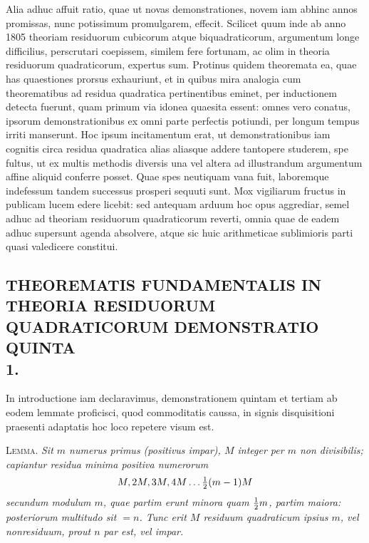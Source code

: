 \documentclass[twoside,12pt]{memoir}
\let\oldfrac\frac
\def\frac#1#2{\mathchoice{\tfrac{#1}{#2}}{\oldfrac{#1}{#2}}{\genfrac{}{}{}{2}{#1}{#2\mathstrut}}{\genfrac{}{}{}{3}{#1}{#2\mathstrut}}}
\begin{document}
Alia adhuc affuit ratio, quae ut novas demonstrationes, novem iam abhinc annos promissas, nunc potissimum promulgarem, effecit. Scilicet quum inde ab anno 1805 theoriam residuorum cubicorum atque biquadraticorum, argumentum longe difficilius, perscrutari coepissem, similem fere fortunam, ac olim in theoria residuorum quadraticorum, expertus sum. Protinus quidem theoremata ea, quae has quaestiones prorsus exhauriunt, et in quibus mira analogia cum theorematibus ad residua quadratica pertinentibus eminet, per inductionem detecta fuerunt, quam primum via idonea quaesita essent: omnes vero conatus, ipsorum demonstrationibus ex omni parte perfectis potiundi, per longum tempus irriti manserunt. Hoc ipsum incitamentum erat, ut demonstrationibus iam cognitis circa residua quadratica alias aliasque addere tantopere studerem, spe fultus, ut ex multis methodis diversis una vel altera ad illustrandum argumentum affine aliquid conferre posset. Quae spes neutiquam vana fuit, laboremque indefessum tandem successus prosperi sequuti sunt. Mox vigiliarum fructus in publicam lucem edere licebit: sed antequam arduum hoc opus aggrediar, semel adhuc ad theoriam residuorum quadraticorum reverti, omnia quae de eadem adhuc supersunt agenda absolvere, atque sic huic arithmeticae sublimioris parti quasi valedicere constitui.\pagebreak%

\subsection*{{\scriptsize THEOREMATIS FUNDAMENTALIS IN THEORIA RESIDUORUM QUADRATICORUM DEMONSTRATIO QUINTA}\\[0.5\baselineskip]
1.}
 
In introductione iam declaravimus, demonstrationem quintam et tertiam ab eodem lemmate proficisci, quod commoditatis caussa, in signis disquisitioni praesenti adaptatis hoc loco repetere visum est.

\textsc{Lemma.} \textit{Sit \(m\) numerus primus (positivus impar), \(M\) integer per \(m\) non divisibilis; capiantur residua minima positiva numerorum}
\[M, 2 M, 3 M, 4 M \ldots \frac{1}{2}(m-1) M\]
\textit{secundum modulum \(m\), quae partim erunt minora quam \(\frac{1}{2} m\), partim maiora: posteriorum multitudo sit \(=n\). Tunc erit \(M\) residuum quadraticum ipsius \(m\), vel nonresiduum, prout \(n\) par est, vel impar.}
 
\end{document}
